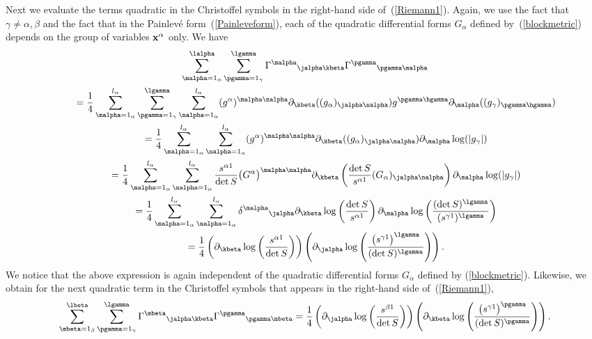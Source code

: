 Next we evaluate the terms quadratic in the Christoffel symbols in the right-hand side of~(\ref{Riemann1}). Again, we use the fact that $\gamma\neq \alpha, \beta$ and the fact that in the Painlev\'e form~(\ref{Painleveform}), each of the quadratic differential forms $G_{\alpha}$ defined by~(\ref{blockmetric}) depends on the group of variables ${\bf x}^{\alpha}$ only. We have
\begin{gather}
\sum_{\malpha=1_{\alpha}}^{\lalpha} \sum_{\pgamma = 1_{\gamma}}^{\lgamma}{\Gamma^{\malpha}}_{\jalpha \kbeta}{\Gamma^{\pgamma}}_{\pgamma \malpha}\nonumber\\
\qquad{} =\frac{1}{4}\sum_{\malpha = 1_{\alpha}}^{l_{\alpha}} \sum_{\pgamma = 1_{\gamma}}^{\lgamma}\sum_{\nalpha=1_{\alpha}}^{l_{\alpha}}(g^{\alpha})^{\malpha \nalpha}\partial_{\kbeta}((g_{\alpha})_{\jalpha \nalpha})g^{\pgamma \hgamma}\partial_{\malpha}((g_{\gamma})_{\pgamma \hgamma})\nonumber\\
\qquad{} =\frac{1}{4}\sum_{\malpha=1_{\alpha}}^{l_{\alpha}}\sum_{\nalpha=1_{\alpha}}^{l_{\alpha}}(g^{\alpha})^{\malpha \nalpha}\partial_{\kbeta}((g_{\alpha})_{\jalpha \nalpha})\partial_{\malpha}\log(|g_{\gamma}|)\nonumber\\
\qquad{} =\frac{1}{4}\sum_{\malpha=1_{\alpha}}^{l_{\alpha}}\sum_{\nalpha=1_{\alpha}}^{l_{\alpha}}\frac{s^{\alpha 1}}{\det S}\big(G^{\alpha}\big)^{\malpha \nalpha}\partial_{\kbeta}\left(\frac{\det S}{s^{\alpha 1}}(G_{\alpha})_{\jalpha \nalpha}\right)\partial_{\malpha}\log(|g_{\gamma}|)\nonumber\\
\qquad{} =\frac{1}{4}\sum_{\malpha=1_{\alpha}}^{l_{\alpha}}\sum_{\nalpha=1_{\alpha}}^{l_{\alpha}}{\delta^{\malpha}}_{\jalpha}\partial_{\kbeta}\log\left(\frac{\det S}{s^{\alpha 1}}\right)\partial_{\malpha}\log \left(\frac{(\det S)^{\lgamma}}{(s^{\gamma 1})^{\lgamma}}\right)\nonumber\\
\qquad{} =\frac{1}{4}\left(\partial_{\kbeta}\log\left(\frac{s^{\alpha 1}}{\det S}\right)\right)\left(\partial_{\jalpha}\log \left(\frac{\big(s^{\gamma 1}\big)^{\lgamma}}{(\det S)^{\lgamma}}\right)\right).\label{quadr1}
\end{gather}
We notice that the above expression is again independent of the quadratic differential forms $G_{\alpha}$ defined by (\ref{blockmetric}). Likewise, we obtain for the next quadratic term in the Christoffel symbols that appears in the right-hand side of~(\ref{Riemann1}),
\begin{gather}\label{quadr2}
\sum_{\mbeta=1_{\beta}}^{\lbeta} \sum_{\pgamma = 1_{\gamma}}^{\lgamma}{\Gamma^{\mbeta}}_{\jalpha \kbeta}{\Gamma^{\pgamma}}_{\pgamma \mbeta}=\frac{1}{4}\left(\partial_{\jalpha}\log\left(\frac{s^{\beta 1}}{\det S}\right)\right)\left(\partial_{\kbeta}\log \left(\frac{\big(s^{\gamma 1}\big)^{\pgamma}}{(\det S)^{\pgamma}}\right)\right).
\end{gather}
